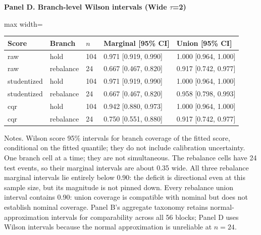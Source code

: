 \begin{table}[!htbp]
\vspace{0.4em}
\par\textbf{Panel D. Branch-level Wilson intervals (Wide $\tau$=2)}
\vspace{0.1em}

\begin{adjustbox}{max width=\linewidth}
\begin{tabular}{@{}lllll@{}}
\toprule
Score & Branch & $n$ & Marginal [95\% CI] & Union [95\% CI] \\
\midrule
raw & hold & 104 & 0.971 [0.919, 0.990] & 1.000 [0.964, 1.000] \\
raw & rebalance & 24 & 0.667 [0.467, 0.820] & 0.917 [0.742, 0.977] \\
studentized & hold & 104 & 0.971 [0.919, 0.990] & 1.000 [0.964, 1.000] \\
studentized & rebalance & 24 & 0.667 [0.467, 0.820] & 0.958 [0.798, 0.993] \\
cqr & hold & 104 & 0.942 [0.880, 0.973] & 1.000 [0.964, 1.000] \\
cqr & rebalance & 24 & 0.750 [0.551, 0.880] & 0.917 [0.742, 0.977] \\
\bottomrule
\end{tabular}
\end{adjustbox}
\vspace{0.5em}
\par\noindent\begin{minipage}{\linewidth}\raggedright{\scriptsize Notes. Wilson score 95\% intervals for branch coverage of the fitted score, conditional on the fitted quantile; they do not include calibration uncertainty. One branch cell at a time; they are not simultaneous. The rebalance cells have 24 test events, so their marginal intervals are about 0.35 wide. All three rebalance marginal intervals lie entirely below 0.90: the deficit is directional even at this sample size, but its magnitude is not pinned down. Every rebalance union interval contains 0.90: union coverage is compatible with nominal but does not establish nominal coverage. Panel B's aggregate taxonomy retains normal-approximation intervals for comparability across all 56 blocks; Panel D uses Wilson intervals because the normal approximation is unreliable at $n=24$.}\end{minipage}\par

\end{table}
